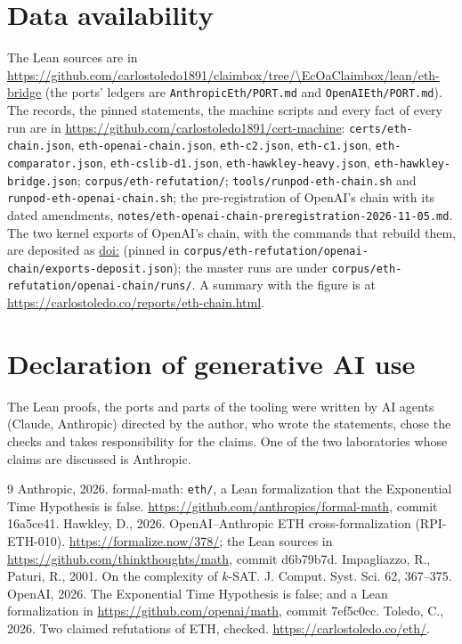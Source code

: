 \documentclass[preprint,11pt,authoryear,a4paper]{elsarticle}
\newcommand{\lean}[1]{\texttt{#1}}
\begin{document}
\section*{Data availability}\label{sec:data}
The Lean sources are in \url{https://github.com/carlostoledo1891/claimbox/tree/\EcOaClaimbox/lean/eth-bridge} (the ports' ledgers are \lean{AnthropicEth/PORT.md} and \lean{OpenAIEth/PORT.md}). The records, the pinned statements, the machine scripts and every fact of every run are in \url{https://github.com/carlostoledo1891/cert-machine}: \lean{certs/eth-chain.json}, \lean{eth-openai-chain.json}, \lean{eth-c2.json}, \lean{eth-c1.json}, \lean{eth-comparator.json}, \lean{eth-cslib-d1.json}, \lean{eth-hawkley-heavy.json}, \lean{eth-hawkley-bridge.json}; \lean{corpus/eth-refutation/}; \lean{tools/runpod-eth-chain.sh} and \lean{runpod-eth-openai-chain.sh}; the pre-registration of OpenAI's chain with its dated amendments, \lean{notes/eth-openai-chain-preregistration-2026-11-05.md}. The two kernel exports of OpenAI's chain, with the commands that rebuild them, are deposited as \href{https://doi.org/\EcOaExportsDoi}{doi:\EcOaExportsDoi} (pinned in \lean{corpus/eth-refutation/openai-chain/exports-deposit.json}); the master runs are under \lean{corpus/eth-refutation/openai-chain/runs/}. A summary with the figure is at \url{https://carlostoledo.co/reports/eth-chain.html}.

\section*{Declaration of generative AI use}
The Lean proofs, the ports and parts of the tooling were written by AI agents (Claude, Anthropic) directed by the author, who wrote the statements, chose the checks and takes responsibility for the claims. One of the two laboratories whose claims are discussed is Anthropic.

\begin{thebibliography}{9}
 Anthropic, 2026. formal-math: \texttt{eth/}, a Lean formalization that the Exponential Time Hypothesis is false. \url{https://github.com/anthropics/formal-math}, commit 16a5ce41.
 Hawkley, D., 2026. OpenAI--Anthropic ETH cross-formalization (RPI-ETH-010). \url{https://formalize.now/378/}; the Lean sources in \url{https://github.com/thinkthoughts/math}, commit d6b79b7d.
 Impagliazzo, R., Paturi, R., 2001. On the complexity of $k$-SAT. J. Comput. Syst. Sci. 62, 367--375.
 OpenAI, 2026. The Exponential Time Hypothesis is false; and a Lean formalization in \url{https://github.com/openai/math}, commit 7ef5c0cc.
 Toledo, C., 2026. Two claimed refutations of ETH, checked. \url{https://carlostoledo.co/eth/}.
\end{thebibliography}
\end{document}
